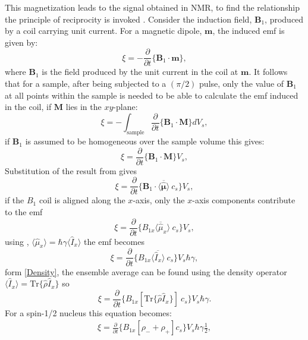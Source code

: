 This magnetization leads to the signal obtained in NMR, to find the relationship the principle of reciprocity
is invoked \citep{Hoult:1976dw}. Consider the induction
field, $\mathbf{B}_1$, produced by a coil carrying unit current. For a magnetic dipole, $\mathbf{m}$,
the induced emf is given by:
\begin{equation}
  \xi = -\frac{\partial}{\partial{t}}\{\mathbf{B}_1\cdot\mathbf{m}\},
\end{equation}
where $\mathbf{B}_1$ is the field produced by the unit current in the coil at $\mathbf{m}$. It follows
that for a sample, after being subjected to a $(\pi/2)$ pulse, only the value of
$\mathbf{B}_1$ at all points within the sample is needed to be able to calculate the emf induced
in the coil, if $\mathbf{M}$ lies in the $xy$-plane:
\begin{equation}
  \xi = -\int_{\text{sample}} \frac{\partial}{\partial{t}}\{\mathbf{B}_1\cdot\mathbf{M}\} dV_s,
\end{equation}
if $\mathbf{B}_1$ is assumed to be homogeneous over the sample volume this gives:
\begin{equation}
  \xi = \frac{\partial}{\partial{t}}\{\mathbf{B}_1\cdot\mathbf{M}\}V_s,
\end{equation}
Substitution of the result from  gives
\begin{equation}
  \xi = \frac{\partial}{\partial{t}}\{\mathbf{B}_1\cdot\langle\overbar{\hat{\pmb{\mu}}}\rangle~c_s\}V_s,
\end{equation}
if the $B_1$ coil is aligned along the $x$-axis, only the $x$-axis components contribute to the emf
\begin{equation}
  \xi = \frac{\partial}{\partial{t}}\{B_{1x}\langle\overbar{\hat{\mu}}_x\rangle~c_s\}V_s,
\end{equation}
using , $\langle\hat{\mu}_x\rangle = \hbar\gamma\langle{\hat{I}_x}\rangle$
the emf becomes
\begin{equation}
  \xi = \frac{\partial}{\partial{t}}\{B_{1x}\langle\overbar{\hat{I}_x}\rangle~c_s\}V_s\hbar\gamma,
\end{equation}
form \ref{Density}, the ensemble average can be found using the density operator
$\langle{\hat{I}_x}\rangle = \text{Tr}\{\hat{\rho}\hat{I}_x\}$ so
\begin{equation}
  \xi = \frac{\partial}{\partial{t}}\{B_{1x}[\text{Tr}\{\hat{\rho}\hat{I}_x\}]~c_s\}V_s\hbar\gamma.
\end{equation}
For a spin-1/2 nucleus this equation becomes:
\begin{align}
  \xi = \frac{\partial}{\partial{t}}\{B_{1x}[\rho_- + \rho_+]c_s\}V_s\hbar\gamma\frac{1}{2},
\end{align}
